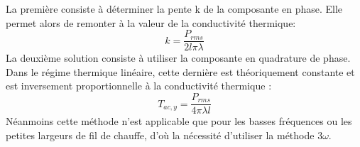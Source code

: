 \documentclass[10pt,a4paper]{report}
\begin{document}
\newline
\newline
La première consiste à déterminer la pente k de la composante en phase. Elle permet alors de remonter à la valeur de la conductivité thermique:
\begin{equation}
k=\frac{P_{rms}}{2l\pi \lambda}
\end{equation}
\newline
La deuxième solution consiste à utiliser la composante en quadrature de phase. Dans le régime thermique linéaire, cette dernière est théoriquement constante et est inversement proportionnelle à la conductivité thermique :
\begin{equation}
T_{ac,y}=\frac{P_{rms}}{4\pi \lambda l}
\end{equation}
Néanmoins cette méthode n'est applicable que pour les basses fréquences ou les petites largeurs de fil de chauffe, d'où la nécessité d'utiliser la méthode 3$\omega$.
\newpage
\end{document}
